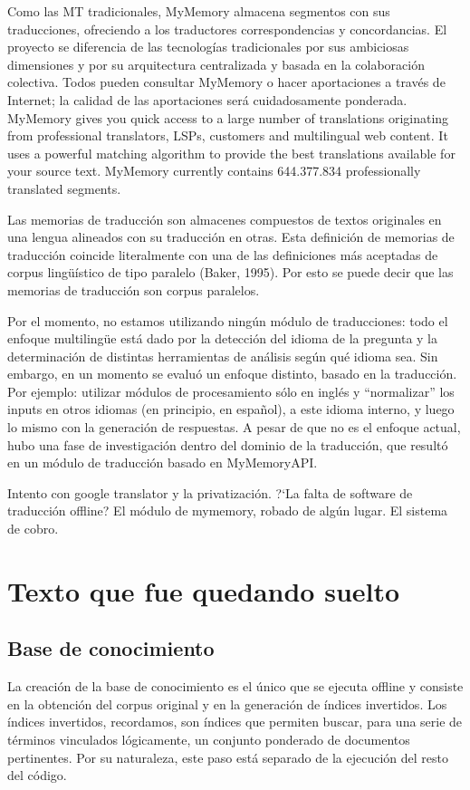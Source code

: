 Como las MT tradicionales, MyMemory almacena segmentos con sus traducciones, ofreciendo a los traductores correspondencias y concordancias. El proyecto se diferencia de las tecnologías tradicionales por sus ambiciosas dimensiones y por su arquitectura centralizada y basada en la colaboración colectiva. Todos pueden consultar MyMemory o hacer aportaciones a través de Internet; la calidad de las aportaciones será cuidadosamente ponderada.
MyMemory gives you quick access to a large number of translations originating from professional translators, LSPs, customers and multilingual web content. It uses a powerful matching algorithm to provide the best translations available for your source text. MyMemory currently contains 644.377.834 professionally translated segments.

Las memorias de traducción son almacenes compuestos de textos originales en una lengua alineados con su traducción en otras. Esta definición de memorias de traducción coincide literalmente con una de las definiciones más aceptadas de corpus lingüístico de tipo paralelo (Baker, 1995). Por esto se puede decir que las memorias de traducción son corpus paralelos.


Por el momento, no estamos utilizando ningún módulo de traducciones:
todo el enfoque multilingüe está dado por la detección del idioma
de la pregunta y la determinación de distintas herramientas de
análisis según qué idioma sea. Sin embargo, en un momento se
evaluó un enfoque distinto, basado en la traducción. Por ejemplo:
utilizar módulos de procesamiento sólo en inglés y
{\textquotedblleft}normalizar{\textquotedblright} los inputs en otros
idiomas (en principio, en espa\~nol), a este idioma interno, y luego lo
mismo con la generación de respuestas. A pesar de que no es el
enfoque actual, hubo una fase de investigación dentro del dominio de
la traducción, que resultó en un módulo de traducción basado en
MyMemoryAPI.

Intento con google translator y la privatización. ?`La falta de
software de traducción offline? El módulo de mymemory, robado de
algún lugar. El sistema de cobro. 


\section{Texto que fue quedando suelto}
\subsection{Base de conocimiento}
La creación de la base de conocimiento es el único que se ejecuta offline
y consiste en la obtención del corpus original y en la generación de índices
invertidos. Los índices invertidos, recordamos, son índices que permiten
buscar, para una serie de términos vinculados lógicamente, un conjunto
ponderado de documentos pertinentes. Por su naturaleza, este paso está 
separado de la ejecución del resto del código.


